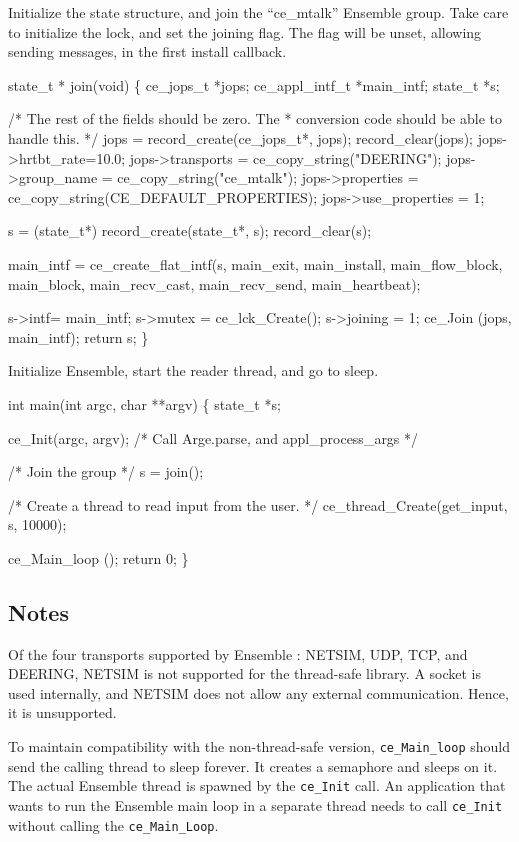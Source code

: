 Initialize the state structure, and join the ``ce\_mtalk'' Ensemble group.
Take care to initialize the lock, and set the joining flag. The flag
will be unset, allowing sending messages, in the first install callback.
\begin{codebox}
state_t *
join(void)
\{
    ce_jops_t *jops; 
    ce_appl_intf_t *main_intf;
    state_t *s;
    
    /* The rest of the fields should be zero. The
     * conversion code should be able to handle this. 
     */
    jops = record_create(ce_jops_t*, jops);
    record_clear(jops);
    jops->hrtbt_rate=10.0;
    jops->transports = ce_copy_string("DEERING");
    jops->group_name = ce_copy_string("ce_mtalk");
    jops->properties = ce_copy_string(CE_DEFAULT_PROPERTIES);
    jops->use_properties = 1;
    
    s = (state_t*) record_create(state_t*, s);
    record_clear(s);
    
    main_intf = ce_create_flat_intf(s,
                main_exit, main_install, main_flow_block,
                main_block, main_recv_cast, main_recv_send,
                main_heartbeat);

    s->intf= main_intf;
    s->mutex = ce_lck_Create();
    s->joining = 1;
    ce_Join (jops, main_intf);
    return s;
\}
\end{codebox}


Initialize Ensemble, start the reader thread, and go to sleep.
\begin{codebox}
int
main(int argc, char **argv)
\{
    state_t *s;
    
    ce_Init(argc, argv); /* Call Arge.parse, and appl_process_args */

    /* Join the group
     */
    s = join();
    
    /* Create a thread to read input from the user.
     */
    ce_thread_Create(get_input, s, 10000);
    
    ce_Main_loop ();
    return 0;
\}
\end{codebox}

\subsection{Notes}
Of the four transports supported by Ensemble : NETSIM, UDP, TCP, and
DEERING, NETSIM is not supported for the thread-safe library. A socket
is used internally, and NETSIM does not allow any
external communication. Hence, it is unsupported.

To maintain compatibility with the non-thread-safe version,
{\tt ce\_Main\_loop} should send the calling thread to sleep forever. It
creates a semaphore and sleeps on it. The actual Ensemble thread is
spawned by the {\tt ce\_Init} call. An application that wants to run
the Ensemble main loop in a separate thread needs to call
{\tt ce\_Init} without calling the {\tt ce\_Main\_Loop}.




